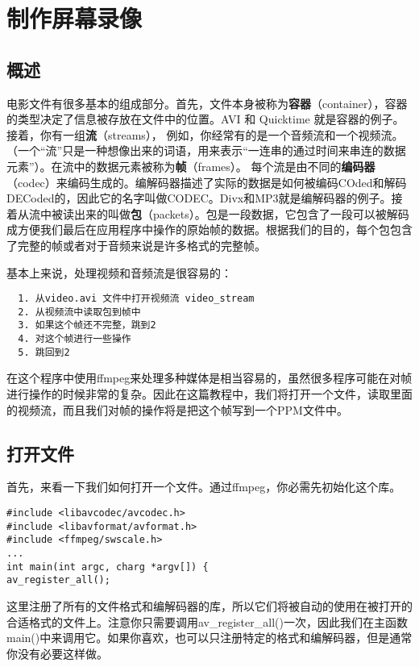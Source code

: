﻿\chapter{制作屏幕录像}
\label{ch1}
\section{概述}
电影文件有很多基本的组成部分。首先，文件本身被称为\textbf{容器}（container），容器的类型决定了信息被存放在文件中的位置。AVI 和 Quicktime 就是容器的例子。接着，你有一组\textbf{流}（streams）， 例如，你经常有的是一个音频流和一个视频流。（一个“流”只是一种想像出来的词语，用来表示“一连串的通过时间来串连的数据元素”）。在流中的数据元素被称为\textbf{帧}（frames）。 每个流是由不同的\textbf{编码器}（codec）来编码生成的。编解码器描述了实际的数据是如何被编码COded和解码DECoded的，因此它的名字叫做CODEC。Divx和MP3就是编解码器的例子。接着从流中被读出来的叫做\textbf{包}（packets）。包是一段数据，它包含了一段可以被解码成方便我们最后在应用程序中操作的原始帧的数据。根据我们的目的，每个包包含了完整的帧或者对于音频来说是许多格式的完整帧。

基本上来说，处理视频和音频流是很容易的：

\begin{verbatim}
  1. 从video.avi 文件中打开视频流 video_stream
  2. 从视频流中读取包到帧中
  3. 如果这个帧还不完整，跳到2
  4. 对这个帧进行一些操作
  5. 跳回到2
\end{verbatim}


在这个程序中使用ffmpeg来处理多种媒体是相当容易的，虽然很多程序可能在对帧进行操作的时候非常的复杂。因此在这篇教程中，我们将打开一个文件，读取里面的视频流，而且我们对帧的操作将是把这个帧写到一个PPM文件中。

\section{打开文件}

首先，来看一下我们如何打开一个文件。通过ffmpeg，你必需先初始化这个库。
\begin{lstlisting}
#include <libavcodec/avcodec.h>
#include <libavformat/avformat.h>
#include <ffmpeg/swscale.h>
...
int main(int argc, charg *argv[]) {
av_register_all();
\end{lstlisting}


这里注册了所有的文件格式和编解码器的库，所以它们将被自动的使用在被打开的合适格式的文件上。注意你只需要调用av_register_all()一次，因此我们在主函数main()中来调用它。如果你喜欢，也可以只注册特定的格式和编解码器，但是通常你没有必要这样做。

